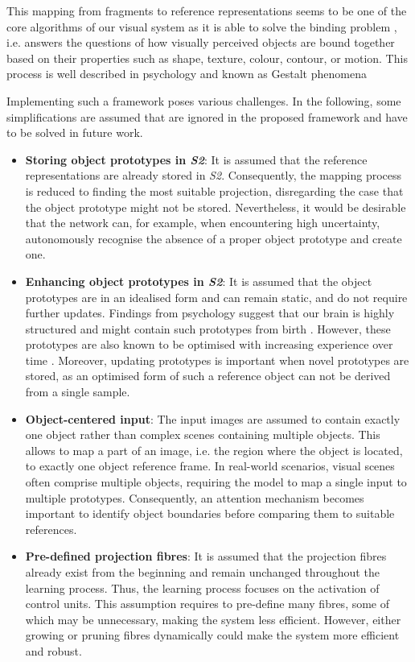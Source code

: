 This mapping from fragments to reference representations seems to be one of the core algorithms of our visual system as it is able to solve the binding problem , i.e. answers the questions of how visually perceived objects are bound together based on their properties such as shape, texture, colour, contour, or motion. This process is well described in psychology and known as Gestalt phenomena \cite{ellis_source_1938, kohler_gestalt_1992, wagemans_century_2012, hamlyn_psychology_2017}

Implementing such a framework poses various challenges.
In the following, some simplifications are assumed that are ignored in the proposed framework and have to be solved in future work.
\begin{itemize}
    \item \textbf{Storing object prototypes in \emph{S2}}: It is assumed that the reference representations are already stored in \emph{S2}. Consequently, the mapping process is reduced to finding the most suitable projection, disregarding the case that the object prototype might not be stored. Nevertheless, it would be desirable that the network can, for example, when encountering high uncertainty, autonomously recognise the absence of a proper object prototype and create one.
    \item \textbf{Enhancing object prototypes in \emph{S2}}: It is assumed that the object prototypes are in an idealised form and can remain static, and do not require further updates. 
    Findings from psychology suggest that our brain is highly structured and might contain such prototypes from birth . However, these prototypes are also known to be optimised with increasing experience over time \cite{simion_face_2015}.
    Moreover, updating prototypes is important when novel prototypes are stored, as an optimised form of such a reference object can not be derived from a single sample.
    \item \textbf{Object-centered input}: The input images are assumed to contain exactly one object rather than complex scenes containing multiple objects. This allows to map a part of an image, i.e. the region where the object is located, to exactly one object reference frame. In real-world scenarios, visual scenes often comprise multiple objects, requiring the model to map a single input to multiple prototypes. Consequently, an attention mechanism becomes important to identify object boundaries before comparing them to suitable references.
    \item \textbf{Pre-defined projection fibres}: It is assumed that the projection fibres already exist from the beginning and remain unchanged throughout the learning process. Thus, the learning process focuses on the activation of control units. This assumption requires to pre-define many fibres, some of which may be unnecessary, making the system less efficient. However, either growing or pruning fibres dynamically could make the system more efficient and robust.
\end{itemize}

